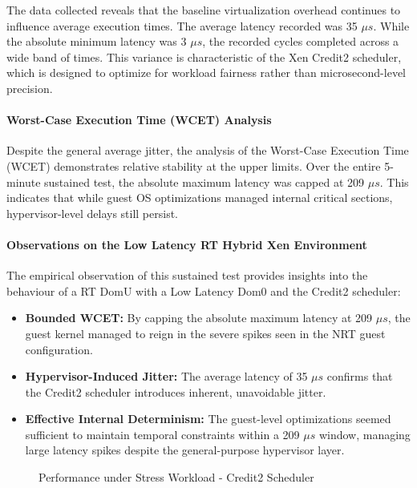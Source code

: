 The data collected reveals that the baseline virtualization overhead
continues to influence average execution times. The average latency
recorded was 35 $\mu s$. While the absolute minimum latency was 3 $\mu s$, the
recorded cycles completed across a wide band of times. This variance is
characteristic of the Xen Credit2 scheduler, which is designed to
optimize for workload fairness rather than microsecond-level precision.

\paragraph{Worst-Case Execution Time (WCET)
Analysis}\label{worst-case-execution-time-wcet-analysis-16}

Despite the general average jitter, the analysis of the Worst-Case
Execution Time (WCET) demonstrates relative stability at the upper
limits. Over the entire 5-minute sustained test, the absolute maximum
latency was capped at 209 $\mu s$. This indicates that while guest OS
optimizations managed internal critical sections, hypervisor-level
delays still persist.

\paragraph{Observations on the Low Latency RT Hybrid Xen
Environment}\label{observations-on-the-low-latency-rt-hybrid-xen-environment-1}

The empirical observation of this sustained test provides insights into
the behaviour of a RT DomU with a Low Latency Dom0 and the Credit2
scheduler:

\begin{itemize}
\item
  \textbf{Bounded WCET:} By capping the absolute maximum latency at 209
  $\mu s$, the guest kernel managed to reign in the severe spikes seen in the
  NRT guest configuration.
\item
  \textbf{Hypervisor-Induced Jitter:} The average latency of 35 $\mu s$
  confirms that the Credit2 scheduler introduces inherent, unavoidable
  jitter.
\item
  \textbf{Effective Internal Determinism:} The guest-level optimizations
  seemed sufficient to maintain temporal constraints within a 209 $\mu s$
  window, managing large latency spikes despite the general-purpose
  hypervisor layer.
\end{itemize}

\begin{figure}
\centering

\caption{Performance under Stress Workload - Credit2 Scheduler}
\end{figure}

